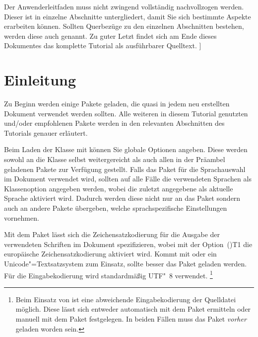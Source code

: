 \documentclass[%
  english,ngerman,%
  cdgeometry=no,DIV=12,%
  cd=false,cdfont=false,cdtitle=true,%
  headings=normal,%
  automark,%
  listof=toc,%
]{tudscrartcl}
\begin{document}
  Der Anwenderleitfaden muss nicht zwingend vollständig nachvollzogen werden. 
  Dieser ist in einzelne Abschnitte untergliedert, damit Sie sich bestimmte 
  Aspekte erarbeiten können. Sollten Querbezüge zu den einzelnen Abschnitten 
  bestehen, werden diese auch genannt. Zu guter Letzt findet sich am Ende 
  dieses Dokumentes das komplette Tutorial als ausführbarer Quelltext. 
]
\tableofcontents
\listoffigures
\listoftables



\section{%
  Einleitung%
  \label{sec:introduction}%
}

Zu Beginn werden einige Pakete geladen, die quasi in jedem neu erstellten 
Dokument verwendet werden sollten. Alle weiteren in diesem Tutorial genutzten 
und/oder empfohlenen Pakete werden in den relevanten Abschnitten des Tutorials 
genauer erläutert.

Beim Laden der Klasse mit  können Sie globale Optionen 
angeben. Diese werden sowohl an die Klasse selbst weitergereicht als auch allen 
in der Präambel geladenen Pakete zur Verfügung gestellt. Falls das Paket 
 für die Sprachauswahl im Dokument verwendet wird, sollten auf 
alle Fälle die verwendeten Sprachen als Klassenoption angegeben werden, wobei 
die zuletzt angegebene als aktuelle Sprache aktiviert wird. Dadurch werden 
diese nicht nur an das Paket  sondern auch an andere Pakete 
übergeben, welche sprachspezifische Einstellungen vornehmen.
%
%
Mit dem Paket  lässt sich die Zeichensatzkodierung für die 
Ausgabe der verwendeten Schriften im Dokument spezifizieren, wobei mit der 
Option~\Option(){T1} die europäische Zeichensatzkodierung 
aktiviert wird. Kommt mit  oder  ein 
Unicode"=Textsatzsystem zum Einsatz, sollte besser das Paket  
geladen werden. Für die Eingabekodierung wird standardmäßig UTF"~8 verwendet.%
\footnote{%
  Beim Einsatz von  ist eine abweichende Eingabekodierung der 
  Quelldatei möglich. Diese lässt sich entweder automatisch mit dem Paket 
   ermitteln oder manuell mit dem Paket  
  festgelegen. In beiden Fällen muss das Paket  \emph{vorher} 
  geladen worden sein.
} 
\end{document}

